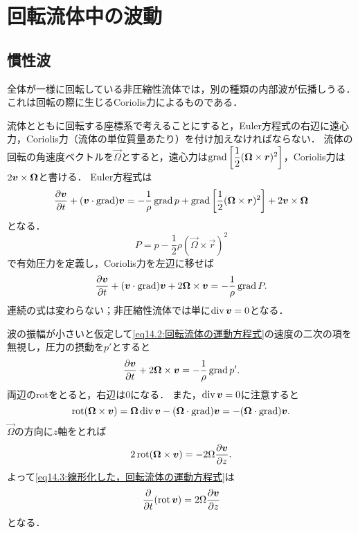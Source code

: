 \section{\spade 回転流体中の波動}
\subsection*{慣性波}
全体が一様に回転している非圧縮性流体では，別の種類の内部波が伝播しうる．
これは回転の際に生じるCoriolis力によるものである．

流体とともに回転する座標系で考えることにすると，Euler方程式の右辺に遠心力，Coriolis力（流体の単位質量あたり）を付け加えなければならない．
流体の回転の角速度ベクトルを$\vec{\Omega}$とすると，遠心力は$\Grad \bqty{\dfrac{1}{2}(\vec{\Omega}\times\vec{r})^2}$，Coriolis力は$2\vb*{v}\times\vb*{\Omega}$と書ける．
Euler方程式は
\[
    \pdv{\v}{t} + (\v\cdot\Grad)\v = -\frac{1}{\rho} \Grad p + \Grad \bqty{\frac{1}{2}(\vec{\Omega}\times\vec{r})^2} + 2\v\times\vec{\Omega}
\]
となる．
\begin{equation}
    P = p-\frac{1}{2}\rho (\vec{\Omega}\times\vec{r})^2 
\end{equation}
で有効圧力を定義し，Coriolis力を左辺に移せば
\begin{equation}\label{eq14.2:回転流体の運動方程式}
    \pdv{\vb*{v}}{t} + (\vb*{v}\cdot\operatorname{grad})\vb*{v} + 2\vb*{\Omega}\times\vb*{v} = -\frac{1}{\rho} \operatorname{grad} P .
\end{equation}
連続の式は変わらない；非圧縮性流体では単に$\operatorname{div}\vb*{v}=0$となる．



波の振幅が小さいと仮定して\eqref{eq14.2:回転流体の運動方程式}の速度の二次の項を無視し，圧力の摂動を$p'$とすると
\begin{equation}\label{eq14.3:線形化した，回転流体の運動方程式}
    \pdv{\vb*{v}}{t} + 2\vb*{\Omega}\times\vb*{v} = -\frac{1}{\rho} \operatorname{grad} p' .
\end{equation}
両辺のrotをとると，右辺は0になる．
また，$\operatorname{div}\vb*{v}=0$に注意すると
\[
    \operatorname{rot}(\vb*{\Omega}\times\vb*{v}) = \vb*{\Omega} \operatorname{div}\vb*{v} - (\vb*{\Omega}\cdot\operatorname{grad})\vb*{v}
    = - (\vb*{\Omega}\cdot\operatorname{grad})\vb*{v} .
\]
$\vec{\Omega}$の方向に$z$軸をとれば
\[
    2 \operatorname{rot}(\vb*{\Omega}\times\vb*{v}) = -2\Omega \pdv{\vb*{v}}{z}.
\]
よって\eqref{eq14.3:線形化した，回転流体の運動方程式}は
\begin{equation}\label{eq14.4:回転流体の渦度方程式}
    \pdv{t}(\operatorname{rot}\vb*{v}) = 2\Omega \pdv{\vb*{v}}{z}
\end{equation}
となる．

